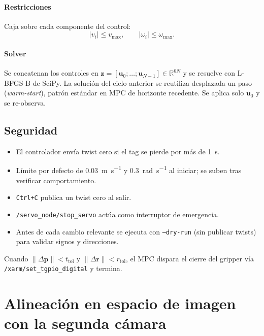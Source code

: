\documentclass[conference]{IEEEtran}
\begin{document}
\paragraph*{Restricciones} Caja sobre cada componente del control:
\begin{equation}
|v_i| \le v_{\max},\qquad |\omega_i| \le \omega_{\max}.
\end{equation}

\paragraph*{Solver} Se concatenan los controles en
$\mathbf{z} = [\mathbf{u}_0; \dots; \mathbf{u}_{N-1}]\in\mathbb{R}^{6N}$
y se resuelve con L-BFGS-B de SciPy. La soluci\'on del ciclo anterior
se reutiliza desplazada un paso (\emph{warm-start}), patr\'on est\'andar
en MPC de horizonte recedente. Se aplica solo $\mathbf{u}_0$ y se
re-observa.

\subsection{Seguridad}

\begin{itemize}
  \item El controlador env\'ia twist cero si el tag se pierde por m\'as
        de \SI{1}{\second}.
  \item L\'imite por defecto de \SI{0.03}{\meter\per\second} y
        \SI{0.3}{\radian\per\second} al iniciar; se suben tras
        verificar comportamiento.
  \item \texttt{Ctrl+C} publica un twist cero al salir.
  \item \texttt{/servo\_node/stop\_servo} act\'ua como interruptor de
        emergencia.
  \item Antes de cada cambio relevante se ejecuta con
        \texttt{--dry-run} (sin publicar twists) para validar signos
        y direcciones.
\end{itemize}

Cuando $\|\Delta\mathbf{p}\| < t_\text{tol}$ y
$\|\Delta\mathbf{r}\| < r_\text{tol}$, el MPC dispara el cierre del
gripper v\'ia \texttt{/xarm/set\_tgpio\_digital} y termina.

\section{Alineaci\'on en espacio de imagen con la segunda c\'amara}
\end{document}
